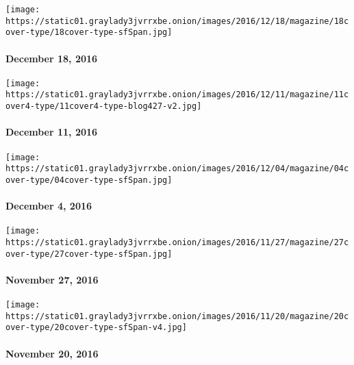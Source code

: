 \href{http://www.nytimes3xbfgragh.onion/indexes/2016/12/18/magazine/index.html}{}

\texttt{[image: https://static01.graylady3jvrrxbe.onion/images/2016/12/18/magazine/18cover-type/18cover-type-sfSpan.jpg]}

\hypertarget{december-18-2016}{%
\paragraph{December 18, 2016}\label{december-18-2016}}

\href{http://www.nytimes3xbfgragh.onion/indexes/2016/12/11/magazine/index.html}{}

\texttt{[image: https://static01.graylady3jvrrxbe.onion/images/2016/12/11/magazine/11cover4-type/11cover4-type-blog427-v2.jpg]}

\hypertarget{december-11-2016}{%
\paragraph{December 11, 2016}\label{december-11-2016}}

\href{http://www.nytimes3xbfgragh.onion/indexes/2016/12/04/magazine/index.html}{}

\texttt{[image: https://static01.graylady3jvrrxbe.onion/images/2016/12/04/magazine/04cover-type/04cover-type-sfSpan.jpg]}

\hypertarget{december-4-2016}{%
\paragraph{December 4, 2016}\label{december-4-2016}}

\href{http://www.nytimes3xbfgragh.onion/indexes/2016/11/27/magazine/index.html}{}

\texttt{[image: https://static01.graylady3jvrrxbe.onion/images/2016/11/27/magazine/27cover-type/27cover-type-sfSpan.jpg]}

\hypertarget{november-27-2016}{%
\paragraph{November 27, 2016}\label{november-27-2016}}

\href{http://www.nytimes3xbfgragh.onion/indexes/2016/11/20/magazine/index.html}{}

\texttt{[image: https://static01.graylady3jvrrxbe.onion/images/2016/11/20/magazine/20cover-type/20cover-type-sfSpan-v4.jpg]}

\hypertarget{november-20-2016}{%
\paragraph{November 20, 2016}\label{november-20-2016}}

